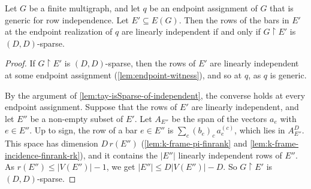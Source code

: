 \begin{theorem}
  \label{thm:bodybar-generic-independence}
  \leanok
  Let $G$ be a finite multigraph, and let $q$ be an endpoint
  assignment of $G$ that is generic for row independence. Let
  $E' \subseteq E(G)$. Then the rows of the bars in $E'$ at the
  endpoint realization of $q$ are linearly independent if and only if
  $G \restriction E'$ is $(D, D)$-sparse.
\end{theorem}
\begin{proof}
  \leanok
  If $G \restriction E'$ is $(D, D)$-sparse, then the rows of $E'$ are
  linearly independent at some endpoint assignment
  (\cref{lem:endpoint-witness}), and so at $q$, as $q$ is generic.

  By the argument of \cref{lem:tay-isSparse-of-independent}, the
  converse holds at every endpoint assignment. Suppose that the rows of
  $E'$ are linearly independent, and let $E''$ be a non-empty subset
  of $E'$. Let $A_{E''}$ be the span of the vectors $a_e$ with
  $e \in E''$. Up to sign, the row of a bar $e \in E''$ is
  $\sum_c (b_e)_c\, a_e^{(c)}$, which lies in $A_{E''}^D$. This space
  has dimension $D\, r(E'')$ (\cref{lem:k-frame-pi-finrank} and
  \cref{lem:k-frame-incidence-finrank-rk}), and it contains the
  $|E''|$ linearly independent rows of $E''$. As
  $r(E'') \le |V(E'')| - 1$, we get $|E''| \le D|V(E'')| - D$. So
  $G \restriction E'$ is $(D, D)$-sparse.
\end{proof}

